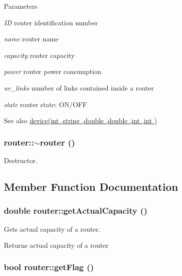 \begin{DoxyParams}{Parameters}
\item[{\em ID}]router identification number \item[{\em name}]router name \item[{\em capacity}]router capacity \item[{\em power}]router power consumption \item[{\em nr\_\-links}]number of links contained inside a router \item[{\em state}]router state: ON/OFF \end{DoxyParams}
\begin{DoxySeeAlso}{See also}
\hyperlink{classdevice_a57b9c4ac7a8bd970b81b1154ae79a5de}{device(int ,string ,double ,double ,int ,int )} 
\end{DoxySeeAlso}
\hypertarget{classrouter_a64870f29b48d6ee6276ec27b1b18e189}{
\subsubsection[{$\sim$router}]{\setlength{\rightskip}{0pt plus 5cm}router::$\sim$router ()}}
\label{classrouter_a64870f29b48d6ee6276ec27b1b18e189}


Destructor. 



\subsection{Member Function Documentation}
\hypertarget{classrouter_a0c1d4a7689e992d90b0fcbf4a958c8b4}{
\subsubsection[{getActualCapacity}]{\setlength{\rightskip}{0pt plus 5cm}double router::getActualCapacity ()}}
\label{classrouter_a0c1d4a7689e992d90b0fcbf4a958c8b4}


Gets actual capacity of a router. 

\begin{DoxyReturn}{Returns}
actual capacity of a router 
\end{DoxyReturn}
\hypertarget{classrouter_aaa3d78b2556a095f725d5a2202265d55}{
\subsubsection[{getFlag}]{\setlength{\rightskip}{0pt plus 5cm}bool router::getFlag ()}}
\label{classrouter_aaa3d78b2556a095f725d5a2202265d55}


